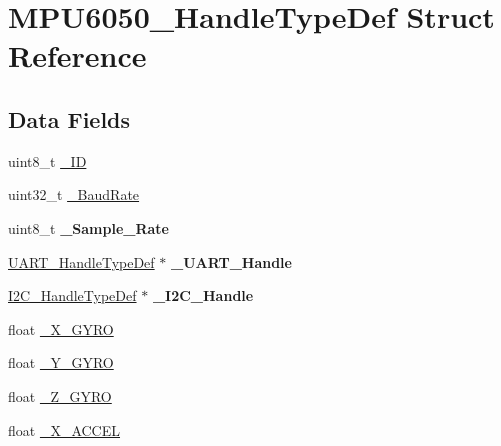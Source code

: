 \hypertarget{struct_m_p_u6050___handle_type_def}{}\section{M\+P\+U6050\+\_\+\+Handle\+Type\+Def Struct Reference}
\label{struct_m_p_u6050___handle_type_def}
\subsection*{Data Fields}
\begin{DoxyCompactItemize}
\item 
uint8\+\_\+t \mbox{\hyperlink{struct_m_p_u6050___handle_type_def_ac07cb35228843be781e258bd39485d6a}{\+\_\+\+ID}}
\item 
uint32\+\_\+t \mbox{\hyperlink{struct_m_p_u6050___handle_type_def_a6e97a9b23568fd2900bf6a2397a20a36}{\+\_\+\+Baud\+Rate}}
\item 
\mbox{\label{struct_m_p_u6050___handle_type_def_a9cc45fbc54c3f6029c03be3a18a7b2a8}} 
uint8\+\_\+t {\bfseries \+\_\+\+Sample\+\_\+\+Rate}
\item 
\mbox{\label{struct_m_p_u6050___handle_type_def_aefc481817957faca32bb883a5a497603}} 
\mbox{\hyperlink{struct_u_a_r_t___handle_type_def}{U\+A\+R\+T\+\_\+\+Handle\+Type\+Def}} $\ast$ {\bfseries \+\_\+\+U\+A\+R\+T\+\_\+\+Handle}
\item 
\mbox{\label{struct_m_p_u6050___handle_type_def_a0d4b76d823d2c0f15dd4cd032373ceb3}} 
\mbox{\hyperlink{struct_i2_c___handle_type_def}{I2\+C\+\_\+\+Handle\+Type\+Def}} $\ast$ {\bfseries \+\_\+\+I2\+C\+\_\+\+Handle}
\item 
float \mbox{\hyperlink{struct_m_p_u6050___handle_type_def_a5cfa2f2a0ea0d3f8edc506238d2f0d9f}{\+\_\+\+X\+\_\+\+G\+Y\+RO}}
\item 
float \mbox{\hyperlink{struct_m_p_u6050___handle_type_def_aa48c90e8e9cc019eb8e5cb8915957f64}{\+\_\+\+Y\+\_\+\+G\+Y\+RO}}
\item 
float \mbox{\hyperlink{struct_m_p_u6050___handle_type_def_a4bd3509d1890263e62ecfd5d3932187b}{\+\_\+\+Z\+\_\+\+G\+Y\+RO}}
\item 
float \mbox{\hyperlink{struct_m_p_u6050___handle_type_def_aaf3e4413134d46aedd2edd71e8789df6}{\+\_\+\+X\+\_\+\+A\+C\+C\+EL}}

\end{DoxyCompactItemize}
